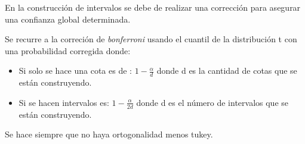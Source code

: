 \documentclass[
]{article}
\begin{document}
En la construcción de intervalos se debe de realizar una corrección para
asegurar una confianza global determinada.

Se recurre a la correción de \emph{bonferroni} usando el cuantil de la
distribución t con una probabilidad corregida donde:

\begin{itemize}
\item
  Si solo se hace una cota es de : \(1-\frac{\alpha}{d}\) donde d es la
  cantidad de cotas que se están construyendo.
\item
  Si se hacen intervalos es: \(1-\frac{\alpha}{2d}\) donde d es el
  número de intervalos que se están construyendo.
\end{itemize}

Se hace siempre que no haya ortogonalidad menos tukey.
\end{document}
